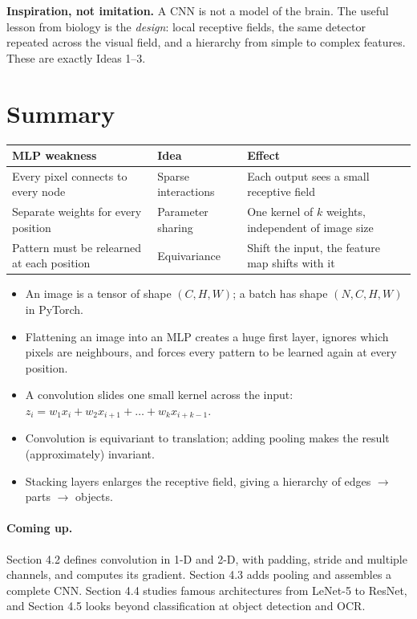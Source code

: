 \documentclass[12pt, a4paper]{article}
\begin{document}
\begin{notebox}
  \textbf{Inspiration, not imitation.} A CNN is not a model of the brain.
  The useful lesson from biology is the \emph{design}: local receptive fields,
  the same detector repeated across the visual field, and a hierarchy from
  simple to complex features. These are exactly Ideas 1--3.
\end{notebox}

\section{Summary}

\begin{center}
  \renewcommand{\arraystretch}{1.35}
  \begin{tabular}{>{\raggedright\arraybackslash}p{5.2cm}
      >{\raggedright\arraybackslash}p{3.6cm}
      >{\raggedright\arraybackslash}p{5.6cm}}
    \toprule
    MLP weakness                                & Idea               & Effect                                              \\
    \midrule
    Every pixel connects to every node          & Sparse interactions & Each output sees a small receptive field            \\
    Separate weights for every position         & Parameter sharing   & One kernel of $k$ weights, independent of image size \\
    Pattern must be relearned at each position  & Equivariance        & Shift the input, the feature map shifts with it     \\
    \bottomrule
  \end{tabular}
\end{center}

\begin{itemize}
  \item An image is a tensor of shape $(C, H, W)$; a batch has shape
        $(N, C, H, W)$ in PyTorch.
  \item Flattening an image into an MLP creates a huge first layer, ignores
        which pixels are neighbours, and forces every pattern to be learned
        again at every position.
  \item A convolution slides one small kernel across the input:
        $z_i = w_1 x_i + w_2 x_{i+1} + \dots + w_k x_{i+k-1}$.
  \item Convolution is equivariant to translation; adding pooling makes the
        result (approximately) invariant.
  \item Stacking layers enlarges the receptive field, giving a hierarchy of
        edges $\to$ parts $\to$ objects.
\end{itemize}

\paragraph{Coming up.}
Section 4.2 defines convolution in 1-D and 2-D, with padding, stride and
multiple channels, and computes its gradient. Section 4.3 adds pooling and
assembles a complete CNN. Section 4.4 studies famous architectures from
LeNet-5 to ResNet, and Section 4.5 looks beyond classification at object
detection and OCR.
\end{document}
